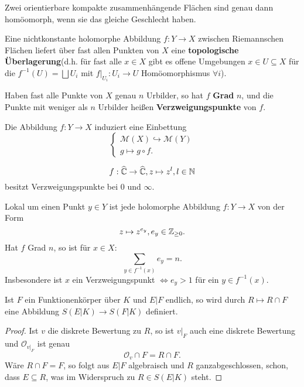 \begin{theorem}
    Zwei orientierbare kompakte zusammenhängende Flächen sind genau dann homöomorph, wenn sie das gleiche Geschlecht haben.
\end{theorem}

\begin{bemerkungnr}
    Eine nichtkonstante holomorphe Abbildung $f: Y \to X$ zwischen Riemannschen Flächen liefert über fast allen Punkten von $X$ eine
    \textbf{topologische Überlagerung}(d.h. für fast alle $x \in X$ gibt es offene Umgebungen $x \in U \subseteq X$ für die
    $f^{-1}(U)=\bigsqcup U_i$ mit $f|_{U_i}: U_i \to U$ Homöomorphismus $\forall i$).

    Haben fast alle Punkte von $X$ genau $n$ Urbilder, so hat $f$ \textbf{Grad} $n$, und die Punkte mit weniger als $n$ Urbilder
    heißen \textbf{Verzweigungspunkte} von $f$.

    Die Abbildung $f: Y \to X$ induziert eine Einbettung
    $$ \begin{cases}
            \mathcal{M}(X) \hookrightarrow \mathcal{M}(Y)\\
            g \mapsto g \circ f.
        \end{cases}$$
\end{bemerkungnr}

\begin{beispiel}
    $$f : \widehat{\mathbb{C}} \to \widehat{\mathbb{C}}, z \mapsto z^l, l \in \mathbb{N}$$
    besitzt Verzweigungspunkte bei $0$ und $\infty$.
\end{beispiel}

\begin{bemerkungnr}
    Lokal um einen Punkt $y \in Y$ ist jede holomorphe Abbildung $f: Y \to X$ von der Form
    $$ z \mapsto z^{e_y}, e_y \in \mathbb{Z}_{\geq 0}.$$
    Hat $f$ Grad $n$, so ist für $x \in X$:
    $$ \sum\limits_{y \in f^{-1}(x)} e_y = n. $$
    Insbesondere ist $x$ ein Verzweigungspunkt $\iff e_y > 1$ für ein $y \in f^{-1}(x)$.
\end{bemerkungnr}

\begin{satz}
    Ist $F$ ein Funktionenkörper über $K$ und $E|F$ endlich, so wird durch $R \mapsto R \cap F$ eine Abbildung
    $S(E|K) \to S(F|K)$ definiert.
\end{satz}
\begin{proof}
    Ist $v$ die diskrete Bewertung zu $R$, so ist $v|_F$ auch eine diskrete Bewertung und 
    $\mathcal{O}_{v|_F}$ ist genau 
    $$ \mathcal{O}_v \cap F = R \cap F.$$
    Wäre $R\cap F = F$, so folgt aus $E|F$ algebraisch und $R$ ganzabgeschlossen, schon, dass $E \subseteq R$,
    was im Widerspruch zu $R \in S(E|K)$ steht.
\end{proof}

